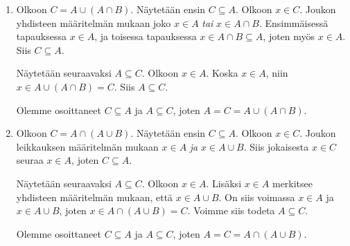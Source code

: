 \documentclass[11pt,a4paper]{amsart}
\begin{document}
\begin{solution}
\leavevmode\par
\begin{enumerate}[label=\alph*), nosep]
\item Olkoon \(C = A \cup (A \cap B)\). Näytetään ensin \(C \subseteq A\).
Olkoon \(x \in C\). Joukon yhdisteen määritelmän mukaan joko \(x \in
A\) \emph{tai} \(x \in A \cap B\).
Ensimmäisessä tapauksessa \(x \in A\), ja toisessa tapauksessa
\(x \in A \cap B \subseteq A\), joten myös \(x \in A\). Siis \(C \subseteq A\).

Näytetään seuraavaksi \(A \subseteq C\). Olkoon \(x \in A\).
Koska \(x \in A\), niin \(x \in A \cup (A \cap B) = C\).
Siis \(A \subseteq C\).

Olemme osoittaneet \(C \subseteq A\) ja \(A \subseteq C\), joten
\(A = C = A \cup (A \cap B)\).

\item Olkoon \(C = A \cap (A \cup B)\). Näytetään ensin \(C \subseteq A\).
Olkoon \(x \in C\). Joukon leikkauksen määritelmän mukaan \(x \in A\) \emph{ja}
\(x \in A \cup B\). Siis jokaisesta \(x \in C\) seuraa \(x \in A\), joten
\(C \subseteq A\).

Näytetään seuraavaksi \(A \subseteq C\). Olkoon \(x \in A\). Lisäksi
\(x \in A\) merkitsee yhdisteen määritelmän mukaan, että \(x \in A \cup B\).
On siis voimassa \(x \in A\) ja \(x \in A \cup B\), joten
\(x \in A \cap (A \cup B) = C\). Voimme siis todeta \(A \subseteq C\).

Olemme osoittaneet \(C \subseteq A\) ja \(A \subseteq C\), joten
\(A = C = A \cap (A \cup B)\).
\end{enumerate}

\begin{center}
\begin{minipage}{\textwidth}
\centering
{}
\end{minipage}
\end{center}
\end{solution}
\end{document}
